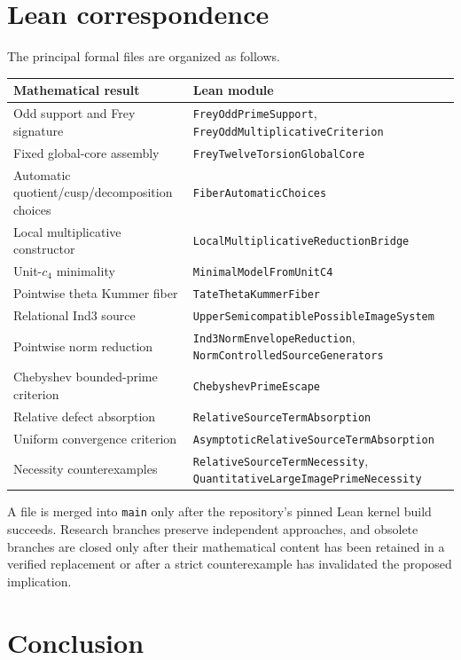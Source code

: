 \documentclass[11pt]{amsart}
\theoremstyle{definition}
\theoremstyle{remark}
\begin{document}
\section{Lean correspondence}

The principal formal files are organized as follows.

\begin{center}
\begin{tabularx}{\textwidth}{@{}lX@{}}
\toprule
Mathematical result & Lean module \\
\midrule
Odd support and Frey signature &
\texttt{FreyOddPrimeSupport}, \texttt{FreyOddMultiplicativeCriterion} \\
Fixed global-core assembly &
\texttt{FreyTwelveTorsionGlobalCore} \\
Automatic quotient/cusp/decomposition choices &
\texttt{FiberAutomaticChoices} \\
Local multiplicative constructor &
\texttt{LocalMultiplicativeReductionBridge} \\
Unit-$c_4$ minimality &
\texttt{MinimalModelFromUnitC4} \\
Pointwise theta Kummer fiber &
\texttt{TateThetaKummerFiber} \\
Relational Ind3 source &
\texttt{UpperSemicompatiblePossibleImageSystem} \\
Pointwise norm reduction &
\texttt{Ind3NormEnvelopeReduction},
\texttt{NormControlledSourceGenerators} \\
Chebyshev bounded-prime criterion &
\texttt{ChebyshevPrimeEscape} \\
Relative defect absorption &
\texttt{RelativeSourceTermAbsorption} \\
Uniform convergence criterion &
\texttt{AsymptoticRelativeSourceTermAbsorption} \\
Necessity counterexamples &
\texttt{RelativeSourceTermNecessity},
\texttt{QuantitativeLargeImagePrimeNecessity} \\
\bottomrule
\end{tabularx}
\end{center}

A file is merged into \texttt{main} only after the repository's pinned Lean
kernel build succeeds.  Research branches preserve independent approaches,
and obsolete branches are closed only after their mathematical content has
been retained in a verified replacement or after a strict counterexample has
invalidated the proposed implication.

\section{Conclusion}
\end{document}
